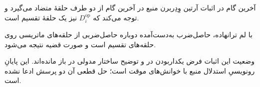 \begin{frame}[t]{آخرین گام در اثبات آرتین وِدِربرن}
    \label{lec12:artin-wedderburn-conclusion}
    منبع در آخرین گام از دو طرف حلقهٔ متضاد می‌گیرد و توجه می‌کند که
    $D_i^{\mathrm{op}}$ نیز یک حلقهٔ تقسیم است.
    \medskip

    با لم ترانهاده، حاصل‌ضرب به‌دست‌آمده دوباره حاصل‌ضربی از حلقه‌های ماتریسی
    روی حلقه‌های تقسیم است و صورت قضیه نتیجه می‌شود.
    \begin{alertblock}{وضعیت این اثبات}
        فرض یکداربودن در  و توضیح ساختار مدولی در 
        باز مانده‌اند. این پایانِ رونویسیِ استدلال منبع با خوانش‌های موقت است؛
        حل قطعی آن دو پرسش ادعا نشده است.
    \end{alertblock}
\end{frame}
